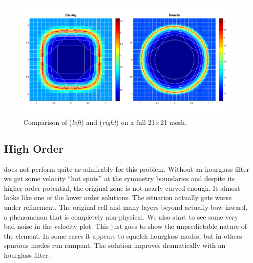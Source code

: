 \begin{figure}[h!]
 \centering
 \includegraphics[width=6in,keepaspectratio=true]{./Figures/SedovFullMeshCompare.png}
 \caption{Comparison of  (\textit{left}) and  (\textit{right}) on a full 21$\times$21 mesh.}
 \label{fig:SedovFullMeshCompare}
\end{figure}


\subsection{High Order \texorpdfstring{}{Q2-Q2}}
 does not perform quite as admirably for this problem. Without an hourglass filter we get some velocity ``hot spots'' at the symmetry boundaries and despite its higher order potential, the original zone is not nearly curved enough. It almost looks like one of the lower order solutions. The situation actually gets worse under refinement. The original cell and many layers beyond actually bow inward, a phenomenon that is completely non-physical. We also start to see some very bad noise in the velocity plot. This just goes to show the unpredictable nature of the  element. In some cases it appears to squelch hourglass modes, but in others spurious modes run rampant. The solution improves dramatically with an hourglass filter.

